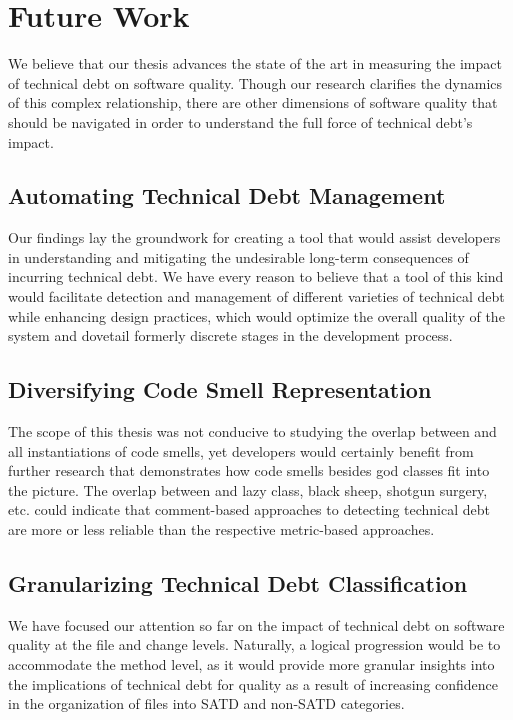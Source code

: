 \section{Future Work}

We believe that our thesis advances the state of the art in measuring the impact of technical debt on software quality. Though our research clarifies the dynamics of this complex relationship, there are other dimensions of software quality that should be navigated in order to understand the full force of technical debt's impact.

\subsection{Automating Technical Debt Management}

Our findings lay the groundwork for creating a tool that would assist developers in understanding and mitigating the undesirable long-term consequences of incurring technical debt. We have every reason to believe that a tool of this kind would facilitate detection and management of different varieties of technical debt while enhancing design practices, which would optimize the overall quality of the system and dovetail formerly discrete stages in the development process.


\subsection{Diversifying Code Smell Representation}

The scope of this thesis was not conducive to studying the overlap between \SATD and all instantiations of code smells, yet developers would certainly benefit from further research that demonstrates how code smells besides god classes fit into the picture. The overlap between \SATD and lazy class, black sheep, shotgun surgery, etc. could indicate that comment-based approaches to detecting technical debt are more or less reliable than the respective metric-based approaches.

\subsection{Granularizing Technical Debt Classification}

We have focused our attention so far on the impact of technical debt on software quality at the file and change levels. Naturally, a logical progression would be to accommodate the method level, as it would provide more granular insights into the implications of technical debt for quality as a result of increasing confidence in the organization of files into SATD and non-SATD categories.
